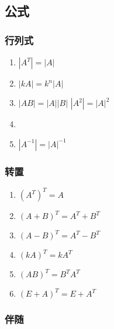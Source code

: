 \documentclass[a4paper,12pt]{article}
\begin{document}
    \subsection{公式}

    \subsubsection{行列式}

    \begin{enumerate}
        \item $|A^T| = |A|$
        \item $|kA| = k^{n}|A|$
        \item $|AB| = |A||B|$ \;\text{,} $|A^2| = |A|^2$
        \item {}
        \item $|A^{-1}| = |A|^{-1}$
    \end{enumerate}

    \subsubsection{转置}

    \begin{enumerate}
        \item $(A^T)^T = A$
        \item $(A + B)^T = A^T + B^T$
        \item $(A - B)^T = A^T - B^T$
        \item $(kA)^T = kA^T$
        \item $(AB)^T = B^{T}A^T $
        \item $(E + A)^T = E + A^T $
    \end{enumerate}

    \subsubsection{伴随}
\end{document}
